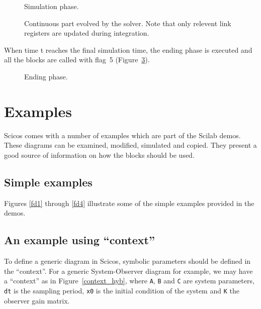 \documentclass{book}
\begin{document}
\begin{figure}[ht]

\caption{Simulation phase.}
\label{simi}
\end{figure}


\begin{figure}[ht]

\caption{Continuous part evolved by the solver. Note that only relevent
link registers are updated during integration.}
\label{solv}
\end{figure}

When time t reaches the final simulation time, the ending phase is executed
and all the blocks are called
with flag~5 (Figure~\ref{finish}).
\begin{figure}[ht]

\caption{Ending phase.}
\label{finish}
\end{figure}





\chapter{Examples}
\label{ch6}
Scicos comes with a number of examples which are part of the Scilab
demos. These diagrams can be examined, modified, simulated and
copied. They present a good source of information on how the blocks
should be used. 

\section{Simple examples}
Figures \ref{fd1} through \ref{fd4} illustrate some of
the simple examples provided in the demos.












\section{An example using ``context''}
\label{exhyb}
To define a generic diagram in Scicos, symbolic parameters should be
defined in the ``context''. For a generic System-Observer diagram for
example, we may have a ``context'' as in Figure~\ref{context_hyb},
where {\tt A}, {\tt B} and {\tt C} are system parameters, {\tt dt} is
the sampling period, {\tt x0} is the initial condition of the system
and {\tt K} the observer gain matrix. 
\end{document}
